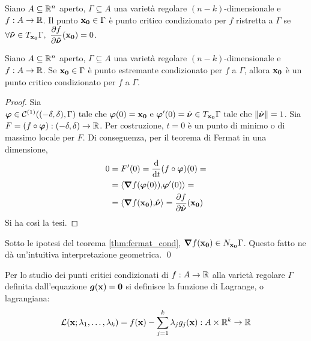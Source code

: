 \begin{definition}
    Siano $A\subseteq\mathbb{R}^n$ aperto, $\Gamma \subseteq A$ una varietà regolare $(n-k)$-dimensionale e $f: A\to\mathbb{R}$. Il punto $\vb{x_0} \in \Gamma$ è punto critico condizionato per $f$ ristretta a $\Gamma$ se $\forall \bm{\hat{\nu}} \in T_{\vb{x_0}}\Gamma, \ \displaystyle\frac{\partial f}{\partial \bm{\hat{\nu}}}(\vb{x_0})=0$. 
\end{definition}

\begin{theorem}
    \label{thm:fermat_cond}
    Siano $A\subseteq\mathbb{R}^n$ aperto, $\Gamma \subseteq A$ una varietà regolare $(n-k)$-dimensionale e $f: A\to\mathbb{R}$. Se $\vb{x_0} \in \Gamma$ è punto estremante condizionato per $f$ a $\Gamma$, allora $\vb{x_0}$ è un punto critico condizionato per $f$ a $\Gamma$.
\end{theorem}

\begin{proof}
    Sia $\bm\varphi\in \mathcal{C}^{(1)}((-\delta,\delta),\Gamma) \text{ tale che } \bm\varphi(0)=\vb{x_0} \text{ e } \bm\varphi'(0)=\hat{\bm\nu}\in T_{\vb{x_0}}\Gamma \text{ tale che } \norm{\hat{\bm\nu}}=1$.
    Sia $F=(f\circ\bm\varphi):(-\delta,\delta)\to\mathbb{R}$. Per costruzione, $t=0$ è un punto di minimo o di massimo locale per $F$.
    Di conseguenza, per il teorema di Fermat in una dimensione,
    \begin{align*}
        0&=F'(0)=\frac{\dd }{\dd t}(f\circ\bm\varphi)(0)=\\
        &=\left\langle\grad f(\bm\varphi(0)){,}\bm\varphi'(0)\right\rangle=\\
        &=\left\langle\grad f(\vb{x_0}){,}\hat{\bm\nu}\right\rangle=\frac{\partial f}{\partial \hat{\bm\nu}}(\vb{x_0})
    \end{align*}
    Si ha così la tesi.
\end{proof}

\begin{corollary}\label{cor:fermat_cond}
    Sotto le ipotesi del teorema \ref{thm:fermat_cond}, $\grad f (\vb{x_0}) \in N_{\vb{x_0}}\Gamma$. Questo fatto ne dà un'intuitiva interpretazione geometrica.
    \qed
\end{corollary}

\begin{definition}
    Per lo studio dei punti critici condizionati di $f: A\to \mathbb{R}$ alla varietà regolare $\Gamma$ definita dall'equazione $\bm g (\vb{x})=\vb{0}$ si definisce la funzione di Lagrange, o lagrangiana:
    $$
        \displaystyle \mathcal{L}(\vb{x};\lambda_1,\dots,\lambda_k)=f(\vb{x})-\sum_{j=1}^k \lambda_j g_j(\vb{x}) : A \times \mathbb{R}^k \to \mathbb{R}
    $$
\end{definition}

